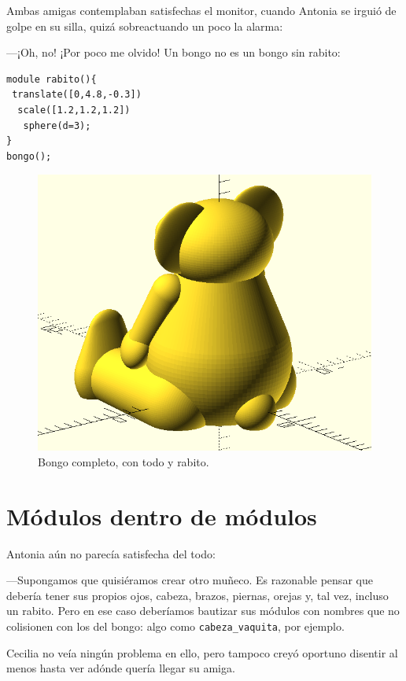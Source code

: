 Ambas amigas contemplaban satisfechas el monitor, cuando Antonia se
irguió de golpe en su silla, quizá sobreactuando un poco la alarma:

---¡Oh, no! ¡Por poco me olvido! Un bongo no es un bongo sin rabito:

  
  \begin{lstlisting}
module rabito(){
 translate([0,4.8,-0.3])
  scale([1.2,1.2,1.2])
   sphere(d=3);
}    
bongo();

\end{lstlisting}


\begin{figure}[ht]
  \centering
  \includegraphics[width=.7\textwidth]{imagenes/bongo-con-rabito}
  \caption{Bongo completo, con todo y rabito.}
  \label{fig:bongo-con-rabito}
\end{figure}

\section{Módulos dentro de módulos}

Antonia aún no parecía satisfecha del todo:

---Supongamos que quisiéramos crear otro muñeco. Es razonable pensar
que debería tener sus propios ojos, cabeza, brazos, piernas, orejas y,
tal vez, incluso un rabito. Pero en ese caso deberíamos bautizar sus
módulos con nombres que no colisionen con los del bongo: algo como
\lstinline!cabeza_vaquita!, por ejemplo.

Cecilia no veía ningún problema en ello, pero tampoco creyó oportuno
disentir al menos hasta ver adónde quería llegar su amiga.

